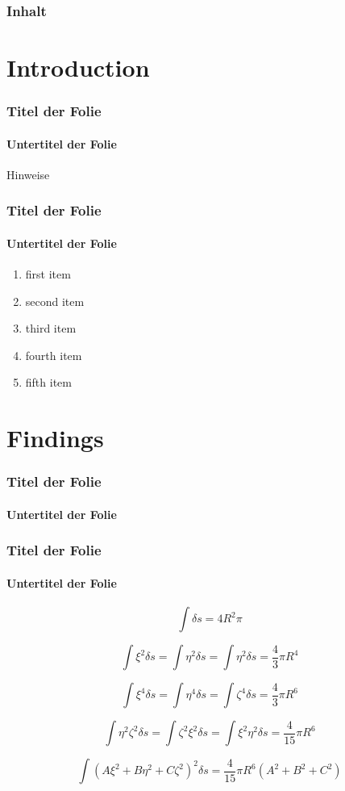 \begin{frame}

\titlepage

\end{frame}

\begin{frame}
\frametitle{Inhalt}

\tableofcontents

\end{frame}

\section{Introduction}

\begin{frame}
\frametitle{Titel der Folie}
\framesubtitle{Untertitel der Folie}

\begin{alert}{Hinweise}
{\scriptsize \blindtext}
\end{alert}


\end{frame}


\begin{frame}
\frametitle{Titel der Folie}
\framesubtitle{Untertitel der Folie}

\begin{enumerate}
\item first item
\item second item
\item third item
\item fourth item
\item fifth item
\end{enumerate}


\end{frame}

\section{Findings}

\begin{frame}
\frametitle{Titel der Folie}
\framesubtitle{Untertitel der Folie}

\blindtext


\end{frame}

\begin{frame}
\frametitle{Titel der Folie}
\framesubtitle{Untertitel der Folie}


\[ \int \delta s = 4 R^2 \pi \]

\[\int \xi^2 \delta s = \int \eta^2 \delta s = \int \eta^2 \delta s = \frac{4}{3} \pi R^4 \]

\[\int \xi^4 \delta s = \int \eta^4 \delta s = \int \zeta^4 \delta s = \frac{4}{3} \pi R^6 \]

\[\int \eta^2 \zeta^2 \delta s = \int \zeta^2 \xi^2 \delta s = \int \xi^2 \eta^2 \delta s = \frac{4}{15} \pi R^6 \]

\[\int \left( A \xi^2 + B \eta^2+ C \zeta^2 \right)^2 \delta s = \frac{4}{15} \pi R^6 \left( A^2 + B^2 + C^2 \right)\]

\end{frame}


